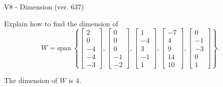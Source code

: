 \begin{exercise}
  \begin{exerciseTitle}V8 - Dimension (ver. 637)\end{exerciseTitle}
  \begin{exerciseStatement}
    Explain how to find the dimension of 
\[W=\mathrm{span}\ \left\{\left[\begin{array}{r}
2 \\
0 \\
-4 \\
-4 \\
-3
\end{array}\right] , \left[\begin{array}{r}
0 \\
0 \\
0 \\
-1 \\
-2
\end{array}\right] , \left[\begin{array}{r}
1 \\
-4 \\
3 \\
-1 \\
1
\end{array}\right] , \left[\begin{array}{r}
-7 \\
4 \\
9 \\
14 \\
10
\end{array}\right] , \left[\begin{array}{r}
0 \\
-1 \\
-3 \\
0 \\
1
\end{array}\right]\right\}.\]



  \end{exerciseStatement}
  \begin{exerciseAnswer}
   The dimension of \(W\) is  \(4\).
  


  \end{exerciseAnswer}
\end{exercise}